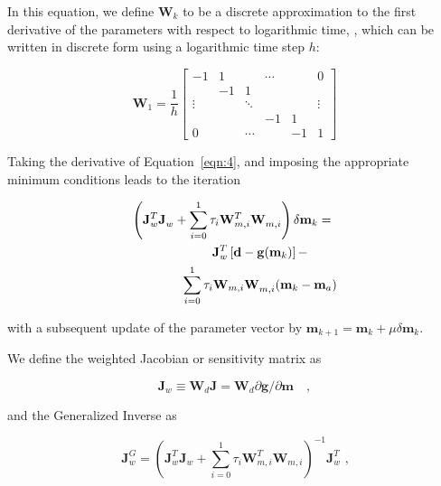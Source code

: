 \documentclass[cp]{copernicus}
\begin{document}
In this equation, we define $\mathbf{W}_k$ to be a discrete approximation to the first derivative 
of 
the parameters with respect to logarithmic time, \cite[see][]{Aster2019a}, which can be written 
in discrete form using a logarithmic time step $h$:
 	 
\begin{equation}\label{eqn:6}
{{\mathbf{W}}_1} = \frac{1}{h}\left[ {\begin{array}{*{20}{c}}
 { - 1}&1&{}& \cdots &{}&0 \\ 
 {}&{ - 1}&1&{}&{}&{} \\ 
 \vdots &{}& \ddots &{}&{}& \vdots \\ 
 {}&{}&{}&{ - 1}&1&{} \\ 
 0&{}& \cdots &{}&{ - 1}&1 
\end{array}} \right]\end{equation} 

Taking the derivative of Equation~\ref{eqn:4}, and imposing the appropriate minimum conditions 
leads 
to the iteration
	
\begin{equation}\label{eqn:7}
\begin{gathered}
 \left(\mathbf{J}_w^T\mathbf{J}_w^{} + 
 \sum\limits_{i = 0}^1 \tau_i \mathbf{W}_{m,i}^T\mathbf{W}_{m,i}^{}\right) 
 \delta\mathbf{m}_k = \hfill \\
 \quad \quad \quad \quad \mathbf{J}_w^T\left[\mathbf{d}-
 \mathbf{g}(\mathbf{m}_k) \right] - \\
 \quad \quad \quad \quad \sum\limits_{i = 0}^1 \tau _i \mathbf{W}_{m,i} 
 \mathbf{W}_{m,i}^{}(\mathbf{m}_k - \mathbf{m}_a) \hfill \\ 
\end{gathered}
\end{equation} 

 \noindent with a subsequent update of the parameter vector by $\mathbf{m}_{k + 1} = \mathbf{m}_k + 
\mu \delta\mathbf{m}_k$.

We define the weighted Jacobian or sensitivity matrix as

\begin{equation}\label{eqn:8}
\mathbf{J}_w \equiv \mathbf{W}_d\mathbf{J} = 
\mathbf{W}_d\partial{\mathbf{g}}/\partial {\mathbf{m}}\quad, 
\end{equation} 

and the Generalized Inverse as

\begin{equation}\label{eqn:9}
\mathbf{J}_w^G = \left(\mathbf{J}_w^T \mathbf{J}_w^{} + 
\sum\limits_{i = 0}^1 \tau_i \mathbf{W}_{m,i}^T \mathbf{W}_{m,i}^{}\right)^{-1} 
\mathbf{J}_w^T{\text{ ,}}
\end{equation} 
\end{document}
